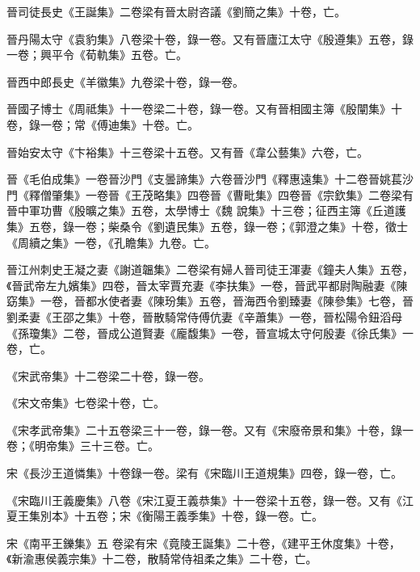 \begin{pinyinscope}
 晉司徒長史《王誕集》二卷梁有晉太尉咨議《劉簡之集》十卷，亡。



 晉丹陽太守《袁豹集》八卷梁十卷，錄一卷。又有晉廬江太守《殷遵集》五卷，錄一卷；興平令《荀軌集》五卷。亡。



 晉西中郎長史《羊徽集》九卷梁十卷，錄一卷。



 晉國子博士《周祗集》十一卷梁二十卷，錄一卷。又有晉相國主簿《殷闡集》十卷，錄一卷；常《傅迪集》十卷。亡。



 晉始安太守《卞裕集》十三卷梁十五卷。又有晉《韋公藝集》六卷，亡。



 晉《毛伯成集》一卷晉沙門《支曇諦集》六卷晉沙門《釋惠遠集》十二卷晉姚萇沙門《釋僧肇集》一卷晉《王茂略集》四卷晉《曹毗集》四卷晉《宗欽集》二卷梁有晉中軍功曹《殷曠之集》五卷，太學博士《魏
 說集》十三卷；征西主簿《丘道護集》五卷，錄一卷；柴桑令《劉遺民集》五卷，錄一卷；《郭澄之集》十卷，徵士《周續之集》一卷，《孔瞻集》九卷。亡。



 晉江州刺史王凝之妻《謝道韞集》二卷梁有婦人晉司徒王渾妻《鐘夫人集》五卷，《晉武帝左九嬪集》四卷，晉太宰賈充妻《李扶集》一卷，晉武平都尉陶融妻《陳窈集》一卷，晉都水使者妻《陳玢集》五卷，晉海西令劉臻妻《陳參集》七卷，晉劉柔妻《王邵之集》十卷，晉散騎常侍傅伉妻《辛蕭集》一卷，晉松陽令鈕滔母《孫瓊集》二卷，晉成公道賢妻《龐馥集》一卷，晉宣城太守何殷妻《徐氏集》一卷，亡。



 《宋武帝集》十二卷梁二十卷，錄一卷。



 《宋文帝集》七卷梁十卷，亡。



 《宋孝武帝集》二十五卷梁三十一卷，錄一卷。又有《宋廢帝景和集》十卷，錄一卷；《明帝集》三十三卷。亡。



 宋《長沙王道憐集》十卷錄一卷。梁有《宋臨川王道規集》四卷，錄一卷，亡。



 《宋臨川王義慶集》八卷《宋江夏王義恭集》十一卷梁十五卷，錄一卷。又有《江夏王集別本》十五卷；宋《衡陽王義季集》十卷，錄一卷。亡。



 宋《南平王鑠集》五
 卷梁有宋《竟陵王誕集》二十卷，《建平王休度集》十卷，《新渝惠侯義宗集》十二卷，散騎常侍祖柔之集》二十卷，亡。




\end{pinyinscope}
